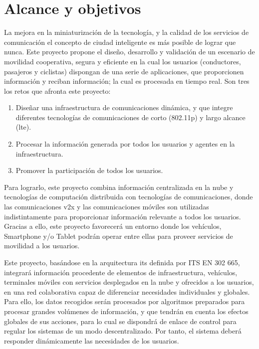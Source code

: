 \chapter{Alcance y objetivos}\label{cha:alcance}
La mejora en la miniaturización de la tecnología, y la calidad de los servicios de comunicación el concepto de ciudad inteligente es más posible de lograr que nunca. Este proyecto propone el diseño, desarrollo y validación de un escenario de movilidad cooperativa, segura y eficiente en la cual los usuarios (conductores, pasajeros y ciclistas) dispongan de una serie de aplicaciones, que proporcionen información y reciban información; la cual es procesada en tiempo real. Son tres los retos que afronta este proyecto:

\begin{enumerate}
	\item Diseñar una infraestructura de comunicaciones dinámica, y que integre diferentes tecnologías de comunicaciones de corto (\gls{802.11p}) y largo alcance (\gls{lte}).

	\item Procesar la información generada por todos los usuarios y agentes en la infraestructura.

	\item Promover la participación de todos los usuarios.

\end{enumerate}
Para lograrlo, este proyecto combina información centralizada en la nube y tecnologías de computación distribuida con tecnologías de comunicaciones, donde las comunicaciones \gls{v2x} y las comunicaciones móviles son utilizadas indistintamente para proporcionar información relevante a todos los usuarios. Gracias a ello, este proyecto favorecerá un entorno donde los vehículos, Smartphone y/o Tablet podrán operar entre ellas para proveer servicios de movilidad a los usuarios.

Este proyecto, basándose en la arquitectura \gls{its} definida por ITS EN 302 665, integrará información procedente de elementos de infraestructura, vehículos, terminales móviles con servicios desplegados en la nube y ofrecidos a los usuarios, en una red colaborativa capaz de diferenciar necesidades individuales y globales. Para ello, los datos recogidos serán procesados por algoritmos preparados para procesar grandes volúmenes de información, y que tendrán en cuenta los efectos globales de sus acciones, para lo cual se dispondrá de enlace de control para regular los sistemas de un modo descentralizado. Por tanto, el sistema deberá responder dinámicamente las necesidades de los usuarios.

